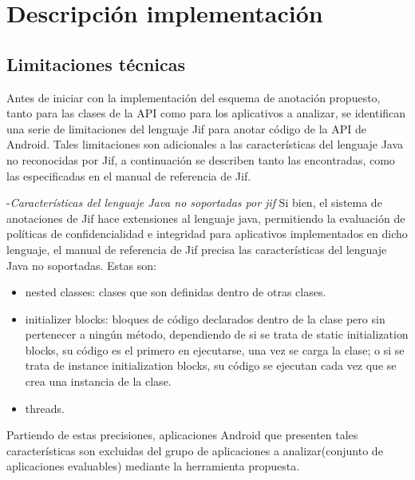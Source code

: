 \chapter{Descripción implementación}

\section{Limitaciones técnicas}
\label{subsec:limitaciones}
Antes de iniciar con la implementación del esquema de anotación propuesto, tanto
para las clases de la API como para los aplicativos a analizar, se
identifican una serie de limitaciones del lenguaje Jif para anotar código de la
API de Android. 
Tales limitaciones son adicionales a las características del lenguaje Java no
reconocidas por Jif, a continuación se describen tanto las encontradas, como las
especificadas en el manual de referencia de Jif.

-\textit{Características del lenguaje Java no soportadas por jif}\newline
Si bien, el sistema de anotaciones de Jif hace extensiones al lenguaje java,
permitiendo la evaluación de políticas de confidencialidad e integridad para
aplicativos implementados en dicho lenguaje, el manual de referencia de Jif
precisa las características del lenguaje Java no soportadas\cite{jifRef}. Estas
son:
\begin{itemize}
  \item nested classes: clases que son definidas dentro de otras clases.
  \item initializer blocks: bloques de código declarados dentro de la clase pero
  sin pertenecer a ningún método, dependiendo de si se trata de static
  initialization blocks, su código es el primero en ejecutarse, una vez se
  carga la clase; o si se trata de instance initialization blocks, su código se
  ejecutan cada vez que se crea una instancia de la clase.
\item threads.
\end{itemize} 
Partiendo de estas precisiones, aplicaciones Android que presenten tales
características son excluidas del grupo de aplicaciones a analizar(conjunto de
aplicaciones evaluables) mediante la herramienta propuesta.


